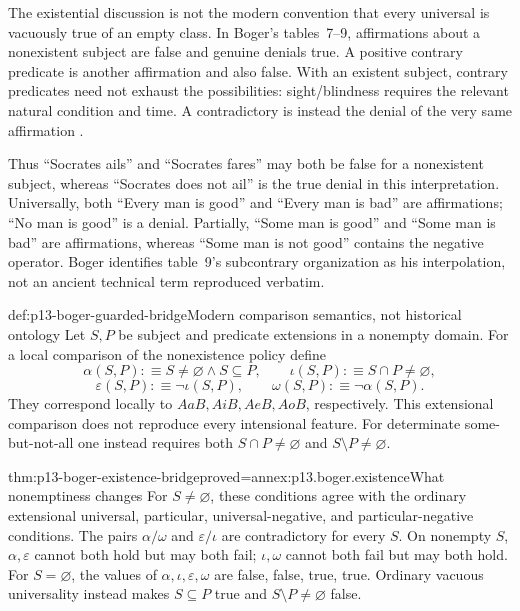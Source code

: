 The existential discussion is not the modern convention that every
universal is vacuously true of an empty class. In Boger's tables~7--9,
affirmations about a nonexistent subject are false and genuine denials
true. A positive contrary predicate is another affirmation and also false.
With an existent subject, contrary predicates need not exhaust the
possibilities: sight/blindness requires the relevant natural condition and
time. A contradictory is instead the denial of the very same affirmation
\parencite[pp.~157--164]{Boger2004UnderlyingLogic}.

Thus \enquote{Socrates ails} and \enquote{Socrates fares} may both be false
for a nonexistent subject, whereas \enquote{Socrates does not ail} is the
true denial in this interpretation. Universally, both
\enquote{Every man is good} and \enquote{Every man is bad} are affirmations;
\enquote{No man is good} is a denial. Partially, \enquote{Some man is good}
and \enquote{Some man is bad} are affirmations, whereas
\enquote{Some man is not good} contains the negative operator.
Boger identifies table~9's subcontrary organization as his interpolation,
not an ancient technical term reproduced verbatim.

\begin{hbdefinition}{def:p13-boger-guarded-bridge}{Modern comparison semantics, not historical ontology}
Let \(S,P\) be subject and predicate extensions in a nonempty domain.
For a local comparison of the nonexistence policy define
\[
 \alpha(S,P)\mathrel{:\equiv} S\ne\varnothing\land S\subseteq P,\qquad
 \iota(S,P)\mathrel{:\equiv} S\cap P\ne\varnothing,
\]
\[
 \varepsilon(S,P)\mathrel{:\equiv}\neg\iota(S,P),\qquad
 \omega(S,P)\mathrel{:\equiv}\neg\alpha(S,P).
\]
They correspond locally to \(AaB,AiB,AeB,AoB\), respectively.
This extensional comparison does not reproduce every intensional feature.
For determinate some-but-not-all one instead requires both
\(S\cap P\ne\varnothing\) and \(S\setminus P\ne\varnothing\).
\end{hbdefinition}

\begin{hbtheorem}{thm:p13-boger-existence-bridge}{proved=annex:p13.boger.existence}{What nonemptiness changes}
For \(S\ne\varnothing\), these conditions agree with the ordinary
extensional universal, particular, universal-negative, and
particular-negative conditions. The pairs \(\alpha/\omega\) and
\(\varepsilon/\iota\) are contradictory for every \(S\).
On nonempty \(S\), \(\alpha,\varepsilon\) cannot both hold but may both
fail; \(\iota,\omega\) cannot both fail but may both hold.
For \(S=\varnothing\), the values of
\(\alpha,\iota,\varepsilon,\omega\) are false, false, true, true.
Ordinary vacuous universality instead makes \(S\subseteq P\) true and
\(S\setminus P\ne\varnothing\) false.
\end{hbtheorem}

